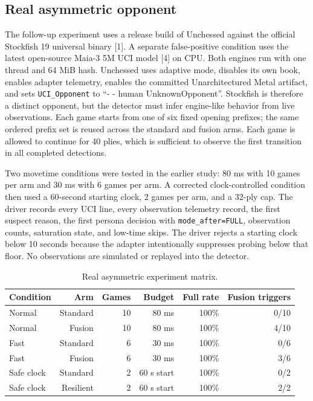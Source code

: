 \documentclass[conference]{IEEEtran}
\begin{document}
\subsection{Real asymmetric opponent}
The follow-up experiment uses a release build of Unchessed against the official Stockfish 19 universal binary [1]. A separate false-positive condition uses the latest open-source Maia-3 5M UCI model [4] on CPU. Both engines run with one thread and 64 MiB hash. Unchessed uses adaptive mode, disables its own book, enables adapter telemetry, enables the committed Unarchitectured Metal artifact, and sets \texttt{UCI\_Opponent} to ``- - human UnknownOpponent''. Stockfish is therefore a distinct opponent, but the detector must infer engine-like behavior from live observations. Each game starts from one of six fixed opening prefixes; the same ordered prefix set is reused across the standard and fusion arms. Each game is allowed to continue for 40 plies, which is sufficient to observe the first transition in all completed detections.

Two movetime conditions were tested in the earlier study: 80 ms with 10 games per arm and 30 ms with 6 games per arm. A corrected clock-controlled condition then used a 60-second starting clock, 2 games per arm, and a 32-ply cap. The driver records every UCI line, every observation telemetry record, the first suspect reason, the first persona decision with \texttt{mode\_after=FULL}, observation counts, saturation state, and low-time skips. The driver rejects a starting clock below 10 seconds because the adapter intentionally suppresses probing below that floor. No observations are simulated or replayed into the detector.

\begin{table}[t]
\caption{Real asymmetric experiment matrix.}
\label{tab:matrix}
\centering
\footnotesize
\begin{tabular}{lrrrrr}
\toprule
Condition & Arm & Games & Budget & Full rate & Fusion triggers\\
\midrule
Normal & Standard & 10 & 80 ms & 100\% & 0/10\\
Normal & Fusion & 10 & 80 ms & 100\% & 4/10\\
Fast & Standard & 6 & 30 ms & 100\% & 0/6\\
Fast & Fusion & 6 & 30 ms & 100\% & 3/6\\
Safe clock & Standard & 2 & 60 s start & 100\% & 0/2\\
Safe clock & Resilient & 2 & 60 s start & 100\% & 2/2\\
\bottomrule
\end{tabular}
\end{table}
\end{document}
